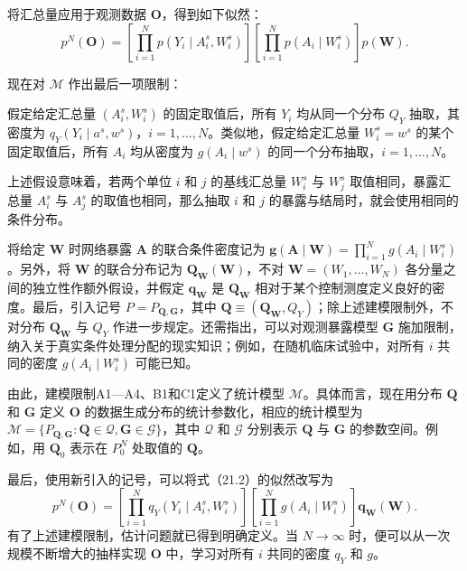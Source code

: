 将汇总量应用于观测数据 $\bm O$，得到如下似然：
\begin{equation}
 p^N(\bm O)
 =\left[\prod_{i=1}^N p(Y_i\mid A_i^s,W_i^s)\right]
  \left[\prod_{i=1}^N p(A_i\mid W_i^s)\right]p(\bm W).
 \tag{21.2}
\end{equation}

现在对 $\mathcal M$ 作出最后一项限制：
\begin{description}[leftmargin=2.8em,labelsep=.6em]
\item[C1.] 假定给定汇总量 $(A_i^s,W_i^s)$ 的固定取值后，所有 $Y_i$ 均从同一个分布 $Q_Y$ 抽取，其密度为 $q_Y(Y_i\mid a^s,w^s)$，$i=1,\ldots,N$。类似地，假定给定汇总量 $W_i^s=w^s$ 的某个固定取值后，所有 $A_i$ 均从密度为 $g(A_i\mid w^s)$ 的同一个分布抽取，$i=1,\ldots,N$。
\end{description}
上述假设意味着，若两个单位 $i$ 和 $j$ 的基线汇总量 $W_i^s$ 与 $W_j^s$ 取值相同，暴露汇总量 $A_i^s$ 与 $A_j^s$ 的取值也相同，那么抽取 $i$ 和 $j$ 的暴露与结局时，就会使用相同的条件分布。

将给定 $\bm W$ 时网络暴露 $\bm A$ 的联合条件密度记为 $\bm g(\bm A\mid\bm W)=\prod_{i=1}^N g(A_i\mid W_i^s)$。另外，将 $\bm W$ 的联合分布记为 $\bm Q_{\bm W}(\bm W)$，不对 $\bm W=(W_1,\ldots,W_N)$ 各分量之间的独立性作额外假设，并假定 $\bm q_{\bm W}$ 是 $\bm Q_{\bm W}$ 相对于某个控制测度定义良好的密度。最后，引入记号 $P=P_{\bm Q,\bm G}$，其中 $\bm Q\equiv(\bm Q_{\bm W},Q_Y)$；除上述建模限制外，不对分布 $\bm Q_{\bm W}$ 与 $Q_Y$ 作进一步规定。还需指出，可以对观测暴露模型 $\bm G$ 施加限制，纳入关于真实条件处理分配的现实知识；例如，在随机临床试验中，对所有 $i$ 共同的密度 $g(A_i\mid W_i^s)$ 可能已知。

由此，建模限制A1—A4、B1和C1定义了统计模型 $\mathcal M$。具体而言，现在用分布 $\bm Q$ 和 $\bm G$ 定义 $\bm O$ 的数据生成分布的统计参数化，相应的统计模型为 $\mathcal M=\{P_{\bm Q,\bm G}:\bm Q\in\mathcal Q,\bm G\in\mathcal G\}$，其中 $\mathcal Q$ 和 $\mathcal G$ 分别表示 $\bm Q$ 与 $\bm G$ 的参数空间。例如，用 $\bm Q_0$ 表示在 $P_0^N$ 处取值的 $\bm Q$。

最后，使用新引入的记号，可以将式（21.2）的似然改写为
\begin{equation}
 p^N(\bm O)
 =\left[\prod_{i=1}^N q_Y(Y_i\mid A_i^s,W_i^s)\right]
  \left[\prod_{i=1}^N g(A_i\mid W_i^s)\right]\bm q_{\bm W}(\bm W).
 \tag{21.3}
\end{equation}
有了上述建模限制，估计问题就已得到明确定义。当 $N\to\infty$ 时，便可以从一次规模不断增大的抽样实现 $\bm O$ 中，学习对所有 $i$ 共同的密度 $q_Y$ 和 $g$。
